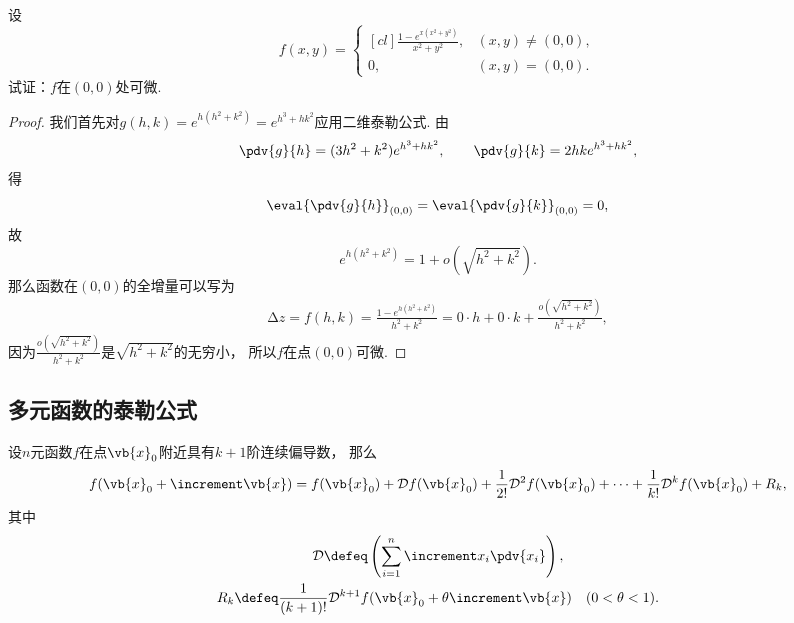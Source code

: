\begin{example}
设\begin{equation*}
	f(x,y)
	= \begin{cases}[cl]
		\frac{1 - e^{x(x^2+y^2)}}{x^2+y^2}, & (x,y)\neq(0,0), \\
		0, & (x,y)=(0,0).
	\end{cases}
\end{equation*}试证：\(f\)在\((0,0)\)处可微.
\begin{proof}
我们首先对\(g(h,k) = e^{h(h^2+k^2)} = e^{h^3+hk^2}\)应用二维泰勒公式.
由\begin{equation*}
	\pdv{g}{h} = (3h^2+k^2)e^{h^3+hk^2}, \qquad
	\pdv{g}{k} = 2hke^{h^3+hk^2},
\end{equation*}得\begin{equation*}
	\eval{\pdv{g}{h}}_{(0,0)}
	= \eval{\pdv{g}{k}}_{(0,0)}
	= 0,
\end{equation*}
故\begin{equation*}
	e^{h(h^2+k^2)} = 1 + o(\sqrt{h^2+k^2}).
\end{equation*}
那么函数在\((0,0)\)的全增量可以写为
\begin{align*}
	\increment z
	= f(h,k)
	= \frac{1 - e^{h(h^2+k^2)}}{h^2+k^2}
	= 0 \cdot h + 0 \cdot k + \frac{o(\sqrt{h^2+k^2})}{h^2+k^2},
\end{align*}
因为\(\frac{o(\sqrt{h^2+k^2})}{h^2+k^2}\)是\(\sqrt{h^2+k^2}\)的无穷小，
所以\(f\)在点\((0,0)\)可微.
\end{proof}
\end{example}

\subsection{多元函数的泰勒公式}
\begin{theorem}\label{theorem:多元函数微分法.多元函数的泰勒公式}
\def\Derivative{\mathcal{D}}  %
设\(n\)元函数\(f\)在点\(\vb{x}_0\)附近具有\(k+1\)阶连续偏导数，
那么\begin{align*}
	f(\vb{x}_0 + \increment\vb{x})
	= f(\vb{x}_0)
	+ \Derivative f(\vb{x}_0)
	+ \frac1{2!} \Derivative^2 f(\vb{x}_0)
	+ \dotsb
	+ \frac1{k!} \Derivative^k f(\vb{x}_0)
	+ R_k,
\end{align*}
其中\begin{gather*}
	\Derivative
	\defeq
	\left( \sum_{i=1}^n \increment x_i \pdv{x_i} \right), \\
	R_k
	\defeq
	\frac1{(k+1)!} \Derivative^{k+1} f(\vb{x}_0 + \theta \increment\vb{x})
	\quad(0<\theta<1).
\end{gather*}
\end{theorem}
